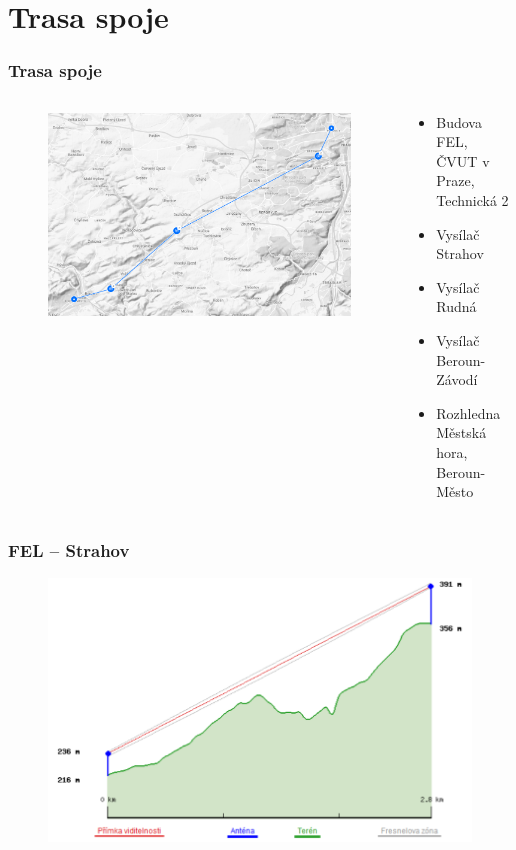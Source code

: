 \documentclass[aspectratio=169, 12pt, hyperref={unicode}]{beamer}
\begin{document}
\section{Trasa spoje}
\begin{frame}
\frametitle{Trasa spoje}
\begin{columns}
\begin{column}{0.5\textwidth}
    \begin{figure}[!ht]
        \centering
        \includegraphics[width=\textwidth]{src/mapa.png}
    \end{figure}
\end{column}
\begin{column}{0.5\textwidth}
\begin{itemize}
\vspace{-1.5cm}
\item Budova FEL, ČVUT v Praze, Technická 2
\item Vysílač Strahov
\item Vysílač Rudná
\item Vysílač Beroun-Závodí
\item Rozhledna Městská hora, Beroun-Město
\end{itemize}
\end{column}
\end{columns}
\end{frame}

\begin{frame}
\frametitle{FEL -- Strahov}
\begin{figure}[!ht]
	\begin{center}
		\includegraphics[width=.7\textwidth]{src/fel-strahov.png}
	\end{center}
\end{figure}
\end{frame}
\end{document}
